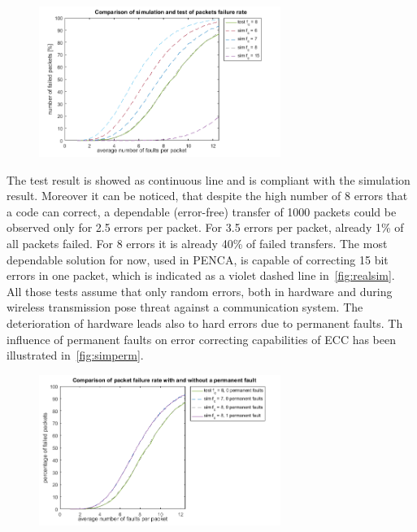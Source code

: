 \begin{figure}[h]
\centering
\includegraphics[width=0.7\textwidth]{figures/real+simulated.png}
\caption{}
\label{fig:realsim}
\end{figure}

The test result is showed as continuous line and is compliant with the simulation result. Moreover it can be noticed, that despite the high number of 8 errors that a code can correct, a dependable (error-free) transfer of 1000 packets could be observed only for 2.5 errors per packet. For 3.5 errors per packet, already 1\% of all packets failed. For 8 errors it is already 40\% of failed transfers. The most dependable solution for now, used in PENCA, is capable of correcting 15 bit errors in one packet, which is indicated as a violet dashed line in~\autoref{fig:realsim}.\\

All those tests assume that only random errors, both in hardware and during wireless transmission pose threat against a communication system. The deterioration of hardware leads also to hard errors due to permanent faults. Th influence of permanent faults on error correcting capabilities of ECC has been illustrated in~\autoref{fig:simperm}.

\begin{figure}[h]
\centering
\includegraphics[width=0.7\textwidth]{figures/simulated+perm.png}
\caption{}
\label{fig:simperm}
\end{figure}

